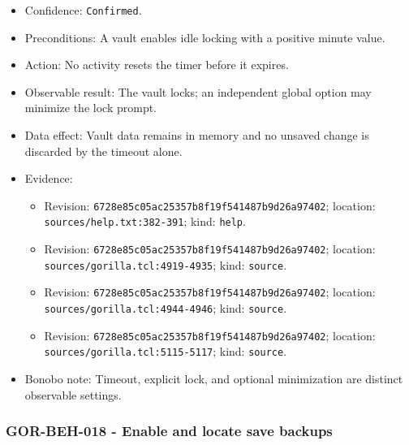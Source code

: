 \documentclass[
  letterpaper,
]{article}
\newcommand{\passthrough}[1]{#1}
\providecommand{\tightlist}{%
  \setlength{\itemsep}{0pt}\setlength{\parskip}{0pt}}
\begin{document}
\begin{itemize}
\tightlist
\item
  Confidence: \passthrough{\lstinline!Confirmed!}.
\item
  Preconditions: A vault enables idle locking with a positive minute value.
\item
  Action: No activity resets the timer before it expires.
\item
  Observable result: The vault locks; an independent global option may minimize the lock prompt.
\item
  Data effect: Vault data remains in memory and no unsaved change is discarded by the timeout alone.
\item
  Evidence:

  \begin{itemize}
  \tightlist
  \item
    Revision: \nolinkurl{6728e85c05ac25357b8f19f541487b9d26a97402}; location: \nolinkurl{sources/help.txt:382-391};
    kind: \passthrough{\lstinline!help!}.
  \item
    Revision: \nolinkurl{6728e85c05ac25357b8f19f541487b9d26a97402}; location: \nolinkurl{sources/gorilla.tcl:4919-4935};
    kind: \passthrough{\lstinline!source!}.
  \item
    Revision: \nolinkurl{6728e85c05ac25357b8f19f541487b9d26a97402}; location: \nolinkurl{sources/gorilla.tcl:4944-4946};
    kind: \passthrough{\lstinline!source!}.
  \item
    Revision: \nolinkurl{6728e85c05ac25357b8f19f541487b9d26a97402}; location: \nolinkurl{sources/gorilla.tcl:5115-5117};
    kind: \passthrough{\lstinline!source!}.
  \end{itemize}
\item
  Bonobo note: Timeout, explicit lock, and optional minimization are distinct observable settings.
\end{itemize}

\subsubsection{GOR-BEH-018 - Enable and locate save backups}\label{gor-beh-018---enable-and-locate-save-backups}
\end{document}
